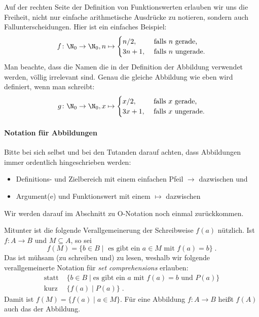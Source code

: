 Auf der rechten Seite der Definition von Funktionswerten erlauben wir uns die
Freiheit, nicht nur einfache arithmetische Ausdrücke zu notieren, sondern \zB
auch Fallunterscheidungen.
%
Hier ist ein einfaches Beispiel:
\[
  f \colon \N_0 \to \N_0, n \mapsto
  \begin{cases}
    n/2, & \text{ falls $n$ gerade,} \\
    3n+1, & \text{ falls $n$ ungerade.}
  \end{cases}
\]
%
Man beachte, dass die Namen die in der Definition der Abbildung
verwendet werden, völlig irrelevant sind.
%
Genau die gleiche Abbildung wie eben wird definiert, wenn man schreibt:
\[
  g \colon \N_0 \to \N_0,  x \mapsto
  \begin{cases}
    x/2, & \text{ falls $x$ gerade,} \\
    3x+1, & \text{ falls $x$ ungerade.}
  \end{cases}
\]
%
\begin{tutorium}
  \paragraph{Notation für Abbildungen}

  Bitte bei sich selbst und bei den Tutanden darauf achten, dass
  Abbildungen immer ordentlich hingeschrieben werden:
  \begin{itemize}
  \item Definitions- und Zielbereich mit einem einfachen Pfeil $\to$
    dazwischen und
  \item Argument(e) und Funktionswert mit einem $\mapsto$ dazwischen
  \end{itemize}

  Wir werden darauf im Abschnitt zu O-Notation noch einmal
  zurückkommen.
\end{tutorium}

\noindent
Mitunter ist die folgende Verallgemeinerung der Schreibweise $f(a)$
nützlich.
%
Ist $f\colon A \to B$ und $M\subseteq A$, so sei
\[
  f(M) = \{ b \in B \mid \text{ es gibt ein } a \in M \text{ mit
  } f(a)=b \} \;.
\]
%
Das ist mühsam (zu schreiben und) zu lesen, weshalb wir folgende
verallgemeinerte Notation für \emph{set comprehensions} erlauben:
\begin{align*}
  \text{statt } &\{ b \in B \mid \text{es gibt ein $a$ mit } f(a)=b \text{ und } P(a) \} \\
  \text{kurz } &\{ f(a) \mid P(a) \} \;.
\end{align*}
%
Damit ist $f(M)=\{ f(a)\mid a\in M\}$.
%
Für eine Abbildung $f\colon A\to B$ heißt $f(A)$ auch das
 der Abbildung.

